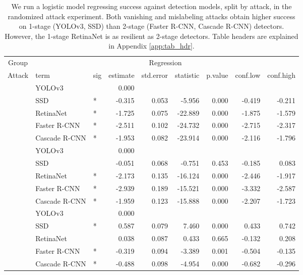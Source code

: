 \begin{longtable}[t]{lllrrrrrr}
\caption{\label{tab:model_stage_table}We run a logistic model regressing success against detection models, split by attack, in the randomized attack experiment. Both vanishing and mislabeling attacks obtain higher success on 1-stage (YOLOv3, SSD) than 2-stage (Faster R-CNN, Cascade R-CNN) detectors. However, the 1-stage RetinaNet is as resilient as 2-stage detectors. Table headers are explained in Appendix \ref{app:tab_hdr}.}\\
\toprule
\multicolumn{1}{c}{Group} & \multicolumn{8}{c}{Regression} \\
\cmidrule(l{3pt}r{3pt}){1-1} \cmidrule(l{3pt}r{3pt}){2-9}
Attack & term & sig & estimate & std.error & statistic & p.value & conf.low & conf.high\\
\midrule
 & YOLOv3 &  & 0.000 &  &  &  &  & \\
\cmidrule{2-9}\nopagebreak
 & SSD & * & -0.315 & 0.053 & -5.956 & 0.000 & -0.419 & -0.211\\
\cmidrule{2-9}\nopagebreak
 & RetinaNet & * & -1.725 & 0.075 & -22.889 & 0.000 & -1.875 & -1.579\\
\cmidrule{2-9}\nopagebreak
 & Faster R-CNN & * & -2.511 & 0.102 & -24.732 & 0.000 & -2.715 & -2.317\\
\cmidrule{2-9}\nopagebreak
\multirow{-5}{*}{\raggedright\arraybackslash Vanishing} & Cascade R-CNN & * & -1.953 & 0.082 & -23.914 & 0.000 & -2.116 & -1.796\\
\cmidrule{1-9}\pagebreak[0]
 & YOLOv3 &  & 0.000 &  &  &  &  & \\
\cmidrule{2-9}\nopagebreak
 & SSD &  & -0.051 & 0.068 & -0.751 & 0.453 & -0.185 & 0.083\\
\cmidrule{2-9}\nopagebreak
 & RetinaNet & * & -2.173 & 0.135 & -16.124 & 0.000 & -2.446 & -1.917\\
\cmidrule{2-9}\nopagebreak
 & Faster R-CNN & * & -2.939 & 0.189 & -15.521 & 0.000 & -3.332 & -2.587\\
\cmidrule{2-9}\nopagebreak
\multirow{-5}{*}{\raggedright\arraybackslash Mislabeling} & Cascade R-CNN & * & -1.959 & 0.123 & -15.888 & 0.000 & -2.207 & -1.723\\
\cmidrule{1-9}\pagebreak[0]
 & YOLOv3 &  & 0.000 &  &  &  &  & \\
\cmidrule{2-9}\nopagebreak
 & SSD & * & 0.587 & 0.079 & 7.460 & 0.000 & 0.433 & 0.742\\
\cmidrule{2-9}\nopagebreak
 & RetinaNet &  & 0.038 & 0.087 & 0.433 & 0.665 & -0.132 & 0.208\\
\cmidrule{2-9}\nopagebreak
 & Faster R-CNN & * & -0.319 & 0.094 & -3.389 & 0.001 & -0.504 & -0.135\\
\cmidrule{2-9}\nopagebreak
\multirow{-5}{*}{\raggedright\arraybackslash Untargeted} & Cascade R-CNN & * & -0.488 & 0.098 & -4.954 & 0.000 & -0.682 & -0.296\\
\bottomrule
\end{longtable}
\endgroup{}

